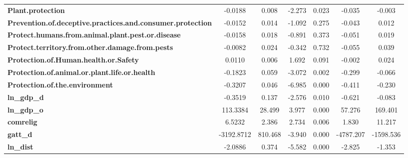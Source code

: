 \begin{center}
\begin{tabular}{lcccccc}
\textbf{Plant.protection}                                          &      -0.0188  &        0.008     &    -2.273  &         0.023        &       -0.035    &       -0.003     \\
\textbf{Prevention.of.deceptive.practices.and.consumer.protection} &      -0.0152  &        0.014     &    -1.092  &         0.275        &       -0.043    &        0.012     \\
\textbf{Protect.humans.from.animal.plant.pest.or.disease}          &      -0.0158  &        0.018     &    -0.891  &         0.373        &       -0.051    &        0.019     \\
\textbf{Protect.territory.from.other.damage.from.pests}            &      -0.0082  &        0.024     &    -0.342  &         0.732        &       -0.055    &        0.039     \\
\textbf{Protection.of.Human.health.or.Safety}                      &       0.0110  &        0.006     &     1.692  &         0.091        &       -0.002    &        0.024     \\
\textbf{Protection.of.animal.or.plant.life.or.health}              &      -0.1823  &        0.059     &    -3.072  &         0.002        &       -0.299    &       -0.066     \\
\textbf{Protection.of.the.environment}                             &      -0.3207  &        0.046     &    -6.985  &         0.000        &       -0.411    &       -0.230     \\
\textbf{ln\_gdp\_d}                                                &      -0.3519  &        0.137     &    -2.576  &         0.010        &       -0.621    &       -0.083     \\
\textbf{ln\_gdp\_o}                                                &     113.3384  &       28.499     &     3.977  &         0.000        &       57.276    &      169.401     \\
\textbf{comrelig}                                                  &       6.5232  &        2.386     &     2.734  &         0.006        &        1.830    &       11.217     \\
\textbf{gatt\_d}                                                   &   -3192.8712  &      810.468     &    -3.940  &         0.000        &    -4787.207    &    -1598.536     \\
\textbf{ln\_dist}                                                  &      -2.0886  &        0.374     &    -5.582  &         0.000        &       -2.825    &       -1.353     \\

\end{tabular}
\end{center}
